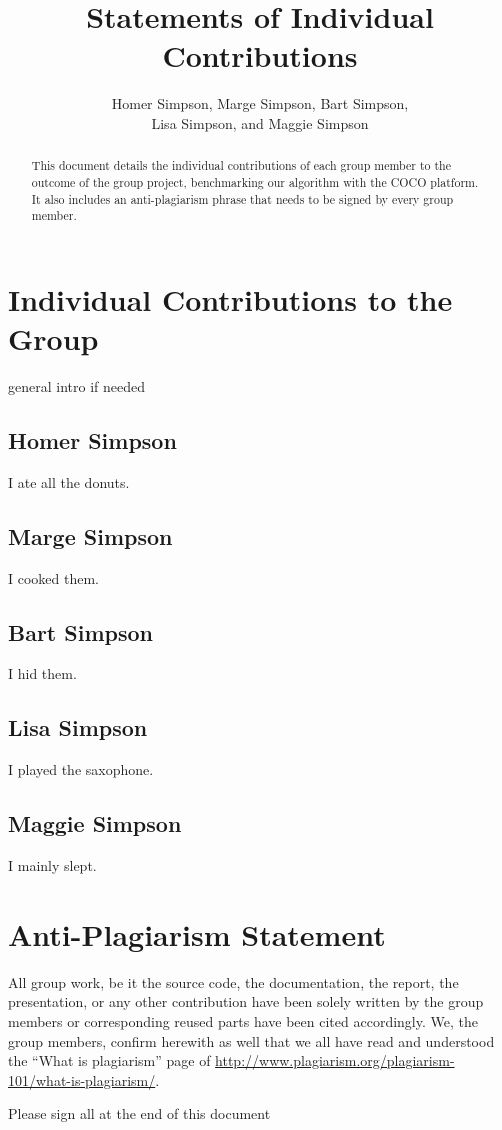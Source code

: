 \documentclass{article}
\newcommand{\REPLACE}[1]{{\color{red} #1}}
\newcommand{\REMOVE}[1]{{\color{red} #1}}
\begin{document}
\title{Statements of Individual Contributions}

\author{Homer Simpson, Marge Simpson, Bart Simpson,\\ Lisa Simpson, and Maggie Simpson}
\maketitle
\begin{abstract}
This document details the individual contributions of each group member to the outcome of the group project, benchmarking \REPLACE{our algorithm} with the COCO platform. It also includes an anti-plagiarism phrase that needs to be signed by every group member.
\end{abstract}


\section{Individual Contributions to the Group}
\REPLACE{general intro if needed}

\subsection{\REPLACE{Homer Simpson}}
I ate all the donuts.

\subsection{\REPLACE{Marge Simpson}}
I cooked them.

\subsection{\REPLACE{Bart Simpson}}
I hid them.

\subsection{\REPLACE{Lisa Simpson}}
I played the saxophone.

\subsection{\REPLACE{Maggie Simpson}}
I mainly slept.

\section{Anti-Plagiarism Statement}
All group work, be it the source code, the documentation, the report, the presentation, or any other contribution have been solely written by the group members or corresponding reused parts have been cited accordingly. We, the group members, confirm herewith as well that we all have read and understood the ``What is plagiarism'' page of \url{http://www.plagiarism.org/plagiarism-101/what-is-plagiarism/}.


\REMOVE{Please sign all at the end of this document}
\end{document}

